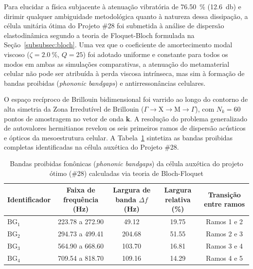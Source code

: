 Para elucidar a física subjacente à atenuação vibratória de \SI{76.50}{\percent} (\SI{12.6}{\decibel}) e dirimir qualquer ambiguidade metodológica quanto à natureza dessa dissipação, a célula unitária ótima do Projeto \#28 foi submetida à análise de dispersão elastodinâmica segundo a teoria de Floquet-Bloch formulada na Seção~\ref{subsubsec:bloch}. Uma vez que o coeficiente de amortecimento modal viscoso ($\zeta = \SI{2.0}{\percent}$, $Q = 25$) foi adotado uniforme e constante para todos os modos em ambas as simulações comparativas, a atenuação do metamaterial celular não pode ser atribuída à perda viscosa intrínseca, mas sim à formação de bandas proibidas (\textit{phononic bandgaps}) e antirressonâncias celulares.

O espaço recíproco de Brillouin bidimensional foi varrido ao longo do contorno de alta simetria da Zona Irredutível de Brillouin ($\Gamma \to \mathrm{X} \to \mathrm{M} \to \Gamma$), com $N_k = 60$ pontos de amostragem no vetor de onda $\mathbf{k}$. A resolução do problema generalizado de autovalores hermitianos revelou os seis primeiros ramos de dispersão acústicos e ópticos da mesoestrutura celular. A Tabela~\ref{tab:bandgaps-bloch} sintetiza as bandas proibidas completas identificadas na célula auxética do Projeto \#28.

\begin{table}[htb]
  \caption{Bandas proibidas fonônicas (\textit{phononic bandgaps}) da célula auxética do projeto ótimo (\#28) calculadas via teoria de Bloch-Floquet}
  \label{tab:bandgaps-bloch}
  \small
  \SingleSpacing
  \begin{center}
    \begin{tabular}{@{}lcccc@{}}
      \toprule
      \textbf{Identificador} & \textbf{Faixa de frequência (\si{\hertz})} & \textbf{Largura de banda $\Delta f$ (\si{\hertz})} & \textbf{Largura relativa (\si{\percent})} & \textbf{Transição entre ramos} \\
      \midrule
      $\text{BG}_1$ & \num{223.78} a \num{272.90} & \num{49.12}  & \num{19.75} & Ramos 1 e 2 \\
      $\text{BG}_2$ & \num{294.73} a \num{499.41} & \num{204.68} & \num{51.55} & Ramos 2 e 3 \\
      $\text{BG}_3$ & \num{564.90} a \num{668.60} & \num{103.70} & \num{16.81} & Ramos 3 e 4 \\
      $\text{BG}_4$ & \num{709.54} a \num{818.70} & \num{109.16} & \num{14.29} & Ramos 4 e 5 \\
      \bottomrule
    \end{tabular}
  \end{center}
\end{table}

